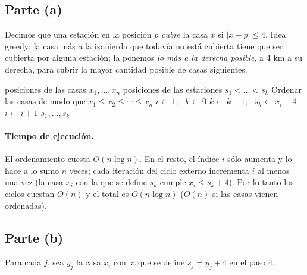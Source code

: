 \subsection*{Parte (a)}
Decimos que una estación en la posición $p$ \emph{cubre} la casa $x$ si $|x-p|\le 4$. Idea
greedy: la casa más a la izquierda que todavía no está cubierta tiene que ser cubierta por alguna
estación; la ponemos \emph{lo más a la derecha posible}, a 4 km a su derecha, para cubrir la
mayor cantidad posible de casas siguientes.

\begin{algorithm}[H]
\caption{Ubicación greedy de estaciones}
\begin{algorithmic}[1]
\Require posiciones de las casas $x_1,\dots,x_n$
\Ensure posiciones de las estaciones $s_1<\dots<s_k$
\State Ordenar las casas de modo que $x_1\le x_2\le\cdots\le x_n$
\State $i\gets 1$; \ $k\gets 0$
 
  \State $k\gets k+1$; \ $s_k\gets x_i+4$
   
    \State $i\gets i+1$
  \EndWhile
\EndWhile
\State \Return $s_1,\dots,s_k$
\end{algorithmic}
\end{algorithm}

\paragraph{Tiempo de ejecución.} El ordenamiento cuesta $O(n\log n)$. En el resto, el índice
$i$ sólo aumenta y lo hace a lo sumo $n$ veces; cada iteración del ciclo externo incrementa $i$
al menos una vez (la casa $x_i$ con la que se define $s_k$ cumple $x_i\le s_k+4$). Por lo tanto
los ciclos cuestan $O(n)$ y el total es $O(n\log n)$ ($O(n)$ si las casas vienen ordenadas).

\subsection*{Parte (b)}
Para cada $j$, sea $y_j$ la casa $x_i$ con la que se define $s_j=y_j+4$ en el paso 4.

